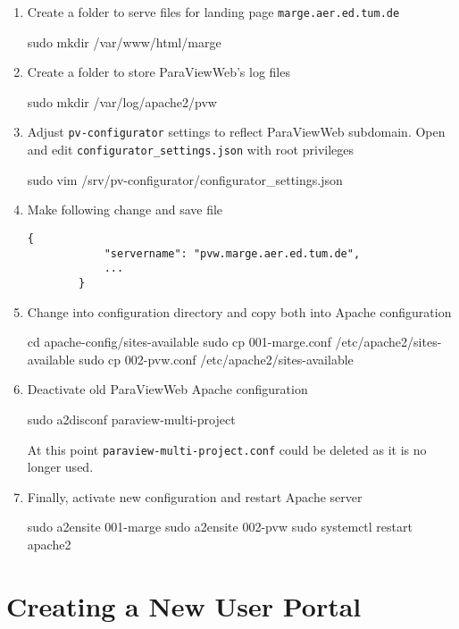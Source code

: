 \begin{enumerate}
    \item Create a folder to serve files for landing page
    \texttt{marge.aer.ed.tum.de}
    \begin{terminal}
        sudo mkdir /var/www/html/marge
    \end{terminal}
    \item Create a folder to store ParaViewWeb's log files
    \begin{terminal}
        sudo mkdir /var/log/apache2/pvw
    \end{terminal}
    \item Adjust \texttt{pv-configurator} settings to reflect ParaViewWeb
    subdomain. Open and edit \texttt{configurator\_settings.json} with root
    privileges
    \begin{terminal}
        sudo vim /srv/pv-configurator/configurator_settings.json
    \end{terminal}
    \item Make following change and save file
    \begin{lstlisting}[basicstyle=\ttfamily\small, frame=single]
        {
            "servername": "pvw.marge.aer.ed.tum.de",
            ...
        }
    \end{lstlisting}
    \item Change into configuration directory and copy both into Apache
    configuration
    \begin{terminal}
        cd apache-config/sites-available
        sudo cp 001-marge.conf /etc/apache2/sites-available
        sudo cp 002-pvw.conf /etc/apache2/sites-available
    \end{terminal}
    \item Deactivate old ParaViewWeb Apache configuration
    \begin{terminal}
        sudo a2disconf paraview-multi-project
    \end{terminal}
    At this point \texttt{paraview-multi-project.conf} could be deleted as it
    is no longer used.
    \item Finally, activate new configuration and restart Apache server
    \begin{terminal}
        sudo a2ensite 001-marge
        sudo a2ensite 002-pvw
        sudo systemctl restart apache2
    \end{terminal}
\end{enumerate}

\section{Creating a New User Portal}

